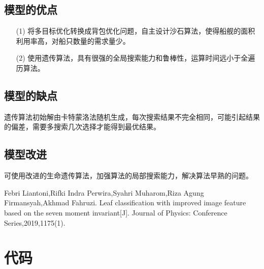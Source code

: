 \documentclass{whutmod}
\begin{document}
	\subsection{模型的优点}
		\begin{itemize}                                             

		\item [(1)] 将多目标优化转换成背包优化问题，自主设计沙石算法，使得船舰的面积利用率高，对船只数量的需求量少。
		\item [(2)] 使用遗传算法，具有很强的全局搜索能力和鲁棒性，运算时间远小于全遍历算法。
	\end{itemize}
	\subsection{模型的缺点}

	遗传算法初始解由卡特蒙洛法随机生成，每次搜索结果不完全相同，可能引起结果的偏差，需要多搜索几次选择才能得到最优结果。
	\subsection{模型改进}
	可使用改进的生命遗传算法，加强算法的局部搜索能力，解决算法早熟的问题。

 
	\newpage	%
	\nocite{*}		%
%
%	
\begin{thebibliography}{9}%
	Febri Liantoni,Rifki Indra Perwira,Syahri Muharom,Riza Agung Firmansyah,Akhmad Fahruzi. Leaf classification with improved image feature based on the seven moment invariant[J]. Journal of Physics: Conference Series,2019,1175(1).

\end{thebibliography}

	\newpage
	\appendix %

\section{代码}
\end{document}

